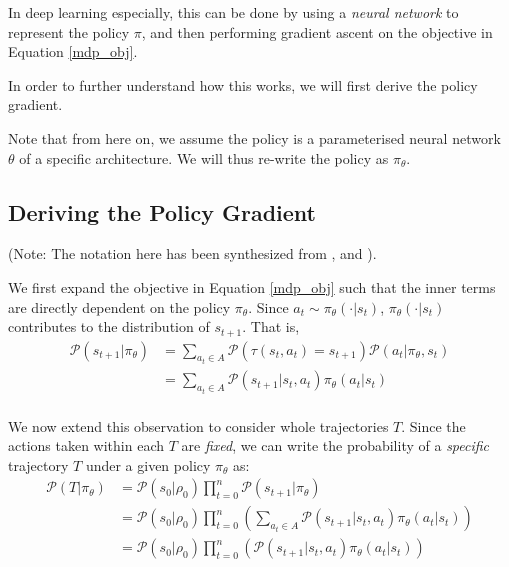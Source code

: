 \documentclass{article} %
\begin{document}
In deep learning especially, this can be done by using a \textit{neural network} to represent the policy $\pi$,
and then performing gradient ascent on the objective in Equation \eqref{mdp_obj}.

In order to further understand how this works, we will first derive the policy gradient.

Note that from here on, we assume the policy is a parameterised neural network $\theta$ of a specific architecture.
We will thus re-write the policy as $\pi_\theta$. 


\subsection{Deriving the Policy Gradient}
(Note: The notation here has been synthesized from \cite{SpinningUp-2018}, \cite{Levine-et-al-2023} and \cite{Weng-2018}).

We first expand the objective in Equation \eqref{mdp_obj}
such that the inner terms are directly dependent on the policy $\pi_\theta$.
Since $a_t \sim \pi_\theta(\cdot | s_t)$, $\pi_\theta(\cdot | s_t)$ contributes to the distribution of $s_{t + 1}$.
That is,
\begin{equation} \label{prob_state}
    \begin{aligned}
        \mathcal{P}(s_{t + 1} | \pi_\theta) & = \sum_{a_t \in A} \mathcal{P}(\tau(s_t, a_t) = s_{t + 1}) \mathcal{P}(a_t | \pi_\theta, s_t) \\
                                            & = \sum_{a_t \in A} \mathcal{P}(s_{t + 1} | s_t, a_t) \pi_\theta(a_t | s_t) \\
    \end{aligned}
\end{equation}

We now extend this observation to consider whole trajectories $T$. Since the actions taken within each $T$ are \textit{fixed},
we can write the probability of a \textit{specific} trajectory $T$ under a given policy $\pi_\theta$ as:
\begin{equation} \label{prob_traj}
    \begin{aligned}
        \mathcal{P}(T | \pi_\theta) & = \mathcal{P}(s_0 | \rho_0) \prod_{t=0}^{n} \mathcal{P}(s_{t + 1} | \pi_\theta) \\
                                    & = \mathcal{P}(s_0 | \rho_0) \prod_{t=0}^{n} \left( \sum_{a_t \in A} \mathcal{P}(s_{t + 1} | s_t, a_t) \pi_\theta(a_t | s_t) \right) \\
                                    & = \mathcal{P}(s_0 | \rho_0) \prod_{t=0}^{n} \left(\mathcal{P}(s_{t + 1} | s_t, a_t) \pi_\theta(a_t | s_t) \right) \\
    \end{aligned}
\end{equation}
\end{document}
